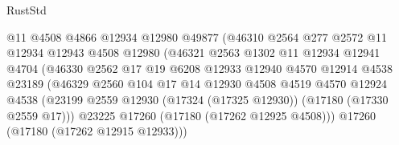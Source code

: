 \begin{lexlean}{RustStd}
\begin{coremodule}
                                    @11
                                    @4508
                                    @4866
                                    @12934
                                    @12980
                                    @49877
                                    (@46310
                                      @2564
                                      @277
                                      @2572
                                      @11
                                      @12934
                                      @12943
                                      @4508
                                      @12980
                                      (@46321
                                        @2563
                                        @1302
                                        @11
                                        @12934
                                        @12941
                                        @4704
                                        (@46330
                                          @2562
                                          @17
                                          @19
                                          @6208
                                          @12933
                                          @12940
                                          @4570
                                          @12914
                                          @4538
                                          @23189
                                          (@46329
                                            @2560
                                            @104
                                            @17
                                            @14
                                            @12930
                                            @4508
                                            @4519
                                            @4570
                                            @12924
                                            @4538
                                            (@23199
                                              @2559
                                              @12930
                                              (@17324 (@17325 @12930))
                                              (@17180 (@17330 @2559 @17)))
                                            @23225
                                            @17260
                                            (@17180 (@17262 @12925 @4508)))
                                          @17260
                                          (@17180 (@17262 @12915 @12933)))

\end{coremodule}
\end{lexlean}
